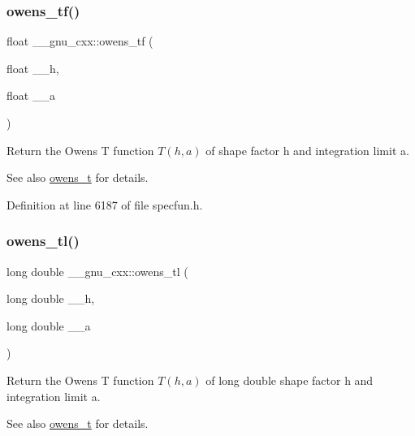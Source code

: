 \subsubsection{\texorpdfstring{owens\+\_\+tf()}{owens\_tf()}}
{\footnotesize\ttfamily float \+\_\+\+\_\+gnu\+\_\+cxx\+::owens\+\_\+tf (\begin{DoxyParamCaption}\item[{float}]{\+\_\+\+\_\+h,  }\item[{float}]{\+\_\+\+\_\+a }\end{DoxyParamCaption})\hspace{0.3cm}{\ttfamily [inline]}}

Return the Owens T function $ T(h,a) $ of shape factor {\ttfamily h} and integration limit {\ttfamily a}.

\begin{DoxySeeAlso}{See also}
\hyperlink{group__mathsf__gnu_gab4e367aae19853cca3af99eead01fcaa}{owens\+\_\+t} for details. 
\end{DoxySeeAlso}


Definition at line 6187 of file specfun.\+h.

\mbox{\label{group__mathsf__gnu_ga7a8bc60dc0ef4a009586872eb7cac2d0}} 
\subsubsection{\texorpdfstring{owens\+\_\+tl()}{owens\_tl()}}
{\footnotesize\ttfamily long double \+\_\+\+\_\+gnu\+\_\+cxx\+::owens\+\_\+tl (\begin{DoxyParamCaption}\item[{long double}]{\+\_\+\+\_\+h,  }\item[{long double}]{\+\_\+\+\_\+a }\end{DoxyParamCaption})\hspace{0.3cm}{\ttfamily [inline]}}

Return the Owens T function $ T(h,a) $ of {\ttfamily long double} shape factor {\ttfamily h} and integration limit {\ttfamily a}.

\begin{DoxySeeAlso}{See also}
\hyperlink{group__mathsf__gnu_gab4e367aae19853cca3af99eead01fcaa}{owens\+\_\+t} for details. 
\end{DoxySeeAlso}


